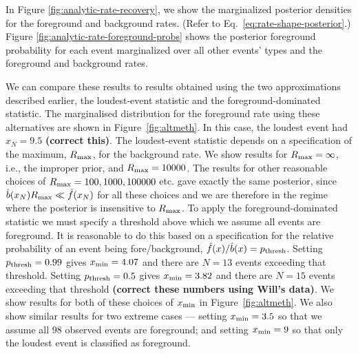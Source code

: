 \documentclass[aps,prd]{revtex4-1}
\newcommand{\jon}[1]{{\color{green} \bf  #1}}
\begin{document}
In Figure \ref{fig:analytic-rate-recovery}, we show the marginalized
posterior densities for the foreground and background rates.  (Refer
to Eq.~\eqref{eq:rate-shape-posterior}.)  Figure
\ref{fig:analytic-rate-foreground-probs} shows the posterior
foreground probability for each event marginalized over all other
events' types and the foreground and background rates.

We can compare these results to results obtained using the two
approximations described earlier, the loudest-event statistic and the
foreground-dominated statistic. The marginalised distribution for the
foreground rate using these alternatives are shown in
Figure~\ref{fig:altmeth}. In this case, the loudest event had
$x_N=9.5$\jon{(correct this)}. The loudest-event statistic depends on
a specification of the maximum, $R_{\rm max}$, for the background
rate. We show results for $R_{\rm max}=\infty$, i.e., the improper
prior, and $R_{\rm max}=10000$. The results for other reasonable
choices of $R_{\rm max} = 100, 1000, 100000$ etc. gave exactly the
same posterior, since $\hat{b}(x_N) R_{\rm max} \ll \hat{f}(x_N)$ for
all these choices and we are therefore in the regime where the
posterior is insensitive to $R_{\rm max}$. To apply the
foreground-dominated statistic we must specify a threshold above which
we assume all events are foreground. It is reasonable to do this based
on a specification for the relative probability of an event being
fore/background, $\hat{f}(x)/\hat{b}(x)=p_{\rm thresh}$. Setting
$p_{\rm thresh}=0.99$ gives $x_{\rm min}=4.07$ and there are $N=13$
events exceeding that threshold. Setting $p_{\rm thresh}=0.5$ gives
$x_{\rm min}=3.82$ and there are $N=15$ events exceeding that
threshold \jon{(correct these numbers using Will's data)}. We show
results for both of these choices of $x_{\rm min}$ in
Figure~\ref{fig:altmeth}. We also show similar results for two extreme
cases --- setting $x_{\rm min}=3.5$ so that we assume all $98$
observed events are foreground; and setting $x_{\rm min}=9$ so that
only the loudest event is classified as foreground.
\end{document}
